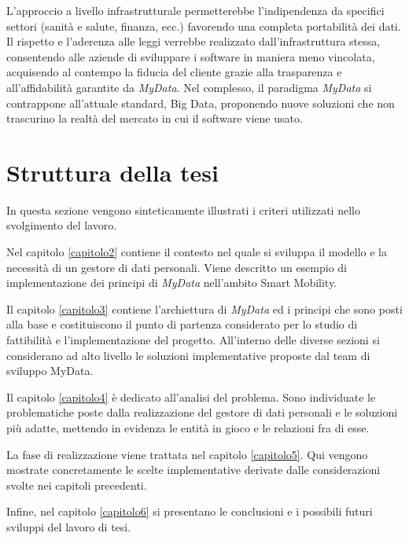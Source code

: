 L’approccio a livello infrastrutturale permetterebbe l’indipendenza da specifici settori (sanit\`a e salute, finanza, ecc.) favorendo una completa portabilit\`a dei dati. Il rispetto e l’aderenza alle leggi verrebbe realizzato dall’infrastruttura stessa, consentendo alle aziende di sviluppare i software in maniera meno vincolata, acquisendo al contempo la fiducia del cliente grazie alla trasparenza e all’affidabilit\`a garantite da \textit{MyData}.
Nel complesso, il paradigma \textit{MyData} si contrappone all’attuale standard, Big Data, proponendo nuove soluzioni che non trascurino la realt\`a del mercato in cui il software viene usato.

\section{Struttura della tesi}

In questa sezione vengono sinteticamente illustrati i criteri utilizzati nello svolgimento del lavoro.

Nel capitolo \ref{capitolo2} contiene il contesto nel quale si sviluppa il modello e la necessit\`a di un gestore di dati personali. Viene descritto un esempio di implementazione dei principi di \textit{MyData} nell'ambito Smart Mobility.

Il capitolo \ref{capitolo3} contiene l'archiettura di \textit{MyData} ed i principi che sono posti alla base e costituiscono il punto di partenza considerato per lo studio di fattibilit\`a e l'implementazione del progetto. All'interno delle diverse sezioni si considerano ad alto livello le soluzioni implementative proposte dal team di sviluppo MyData.

Il capitolo \ref{capitolo4} \`e dedicato all'analisi del problema. Sono individuate le problematiche poste dalla realizzazione del gestore di dati personali e le soluzioni pi\`u adatte, mettendo in evidenza le entit\`a in gioco e le relazioni fra di esse.

La fase di realizzazione viene trattata nel capitolo \ref{capitolo5}. Qui vengono mostrate concretamente le scelte implementative derivate dalle considerazioni svolte nei capitoli precedenti.

Infine, nel capitolo \ref{capitolo6} si presentano le conclusioni e i possibili futuri sviluppi del lavoro di tesi.

